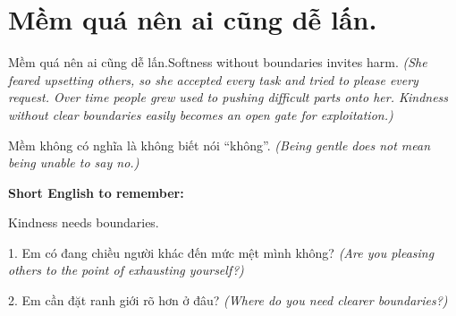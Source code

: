 \section{Mềm quá nên ai cũng dễ lấn.}
\begin{truyen}{Mềm quá nên ai cũng dễ lấn.}{Softness without boundaries invites harm.}
\textit{(She feared upsetting others, so she accepted every task and tried to please every request. Over time people grew used to pushing difficult parts onto her. Kindness without clear boundaries easily becomes an open gate for exploitation.)}
\end{truyen}
\begin{baihoc}
Mềm không có nghĩa là không biết nói “không”.
\textit{(Being gentle does not mean being unable to say no.)}
\end{baihoc}
\begin{ghinhoanh}
\textbf{Short English to remember:}

Kindness needs boundaries.
\end{ghinhoanh}
\begin{tuhocnhanh}
1. Em có đang chiều người khác đến mức mệt mình không? \textit{(Are you pleasing others to the point of exhausting yourself?)}

2. Em cần đặt ranh giới rõ hơn ở đâu? \textit{(Where do you need clearer boundaries?)}
\end{tuhocnhanh}
\ngancach

